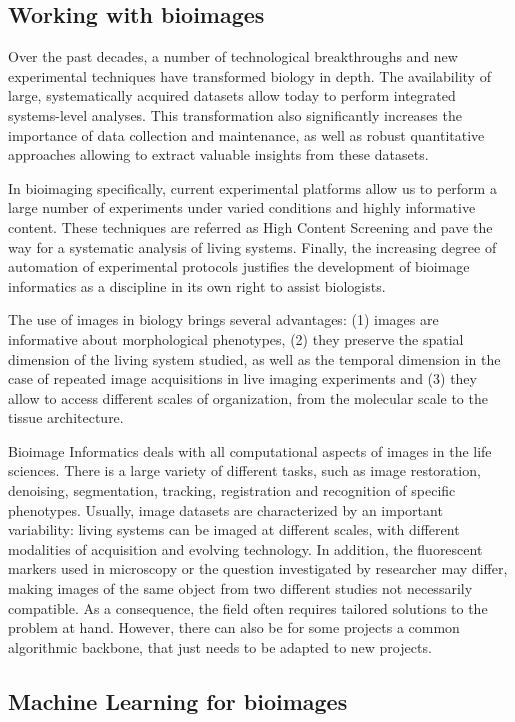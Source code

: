 \subsection{Working with bioimages}
\label{subsec:intro_bioimages}

Over the past decades, a number of technological breakthroughs and new experimental techniques have transformed biology in depth.
The availability of large, systematically acquired datasets allow today to perform integrated systems-level analyses.
This transformation also significantly increases the importance of data collection and maintenance, as well as robust quantitative approaches allowing to extract valuable insights from these datasets.

In bioimaging specifically, current experimental platforms allow us to perform a large number of experiments under varied conditions and highly informative content.
These techniques are referred as High Content Screening and pave the way for a systematic analysis of living systems.
Finally, the increasing degree of automation of experimental protocols justifies the development of bioimage informatics as a discipline in its own right to assist biologists.

The use of images in biology brings several advantages: (1) images are informative about morphological phenotypes, (2) they preserve the spatial dimension of the living system studied, as well as the temporal dimension in the case of repeated image acquisitions in live imaging experiments and (3) they allow to access different scales of organization, from the molecular scale to the tissue architecture.

Bioimage Informatics deals with all computational aspects of images in the life sciences.
There is a large variety of different tasks, such as image restoration, denoising, segmentation, tracking, registration and recognition of specific phenotypes.
Usually, image datasets are characterized by an important variability: living systems can be imaged at different scales, with different modalities of acquisition and evolving technology.
In addition, the fluorescent markers used in microscopy or the question investigated by researcher may differ, making images of the same object from two different studies not necessarily compatible.
As a consequence, the field often requires tailored solutions to the problem at hand.
However, there can also be for some projects a common algorithmic backbone, that just needs to be adapted to new projects.

\subsection{Machine Learning for bioimages}
\label{subsec:intro_ml_tools}

